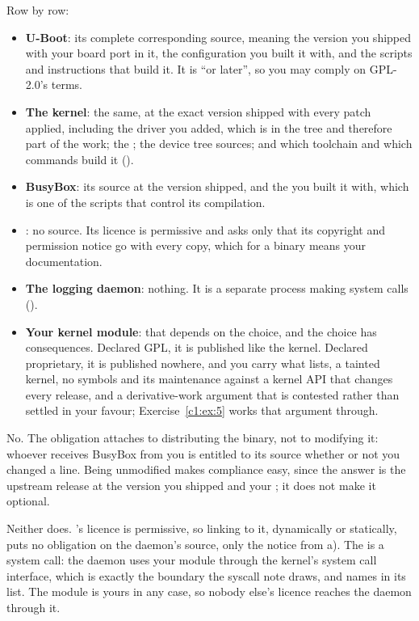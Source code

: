  Row by row:
\begin{itemize}
  \item \textbf{U-Boot}: its complete corresponding source, meaning the version you shipped with
    your board port in it, the configuration you built it with, and the scripts and instructions
    that build it. It is ``or later'', so you may comply on GPL-2.0's terms.
  \item \textbf{The kernel}: the same, at the exact version shipped with every patch applied,
    including the driver you added, which is in the tree and therefore part of the work; the
    ; the device tree sources; and which toolchain and which commands build it
    ().
  \item \textbf{BusyBox}: its source at the version shipped, and the  you built it
    with, which is one of the scripts that control its compilation.
  \item \textbf{}: no source. Its licence is permissive and asks only that its
    copyright and permission notice go with every copy, which for a binary means your
    documentation.
  \item \textbf{The logging daemon}: nothing. It is a separate process making system calls
    ().
  \item \textbf{Your kernel module}: that depends on the choice, and the choice has consequences.
    Declared GPL, it is published like the kernel. Declared proprietary, it is published nowhere,
    and you carry what  lists, a tainted kernel, no 
    symbols and its maintenance against a kernel API that changes every release, and a
    derivative-work argument that is contested rather than settled in your favour;
    Exercise~\ref{c1:ex:5} works that argument through.
\end{itemize}

 No. The obligation attaches to distributing the binary, not to modifying it: whoever
receives BusyBox from you is entitled to its source whether or not you changed a line. Being
unmodified makes compliance easy, since the answer is the upstream release at the version you
shipped and your ; it does not make it optional.

 Neither does. 's licence is permissive, so linking to it, dynamically or
statically, puts no obligation on the daemon's source, only the notice from a). The  is
a system call: the daemon uses your module through the kernel's system call interface, which is
exactly the boundary the syscall note draws, and  names  in its list.
The module is yours in any case, so nobody else's licence reaches the daemon through it.

